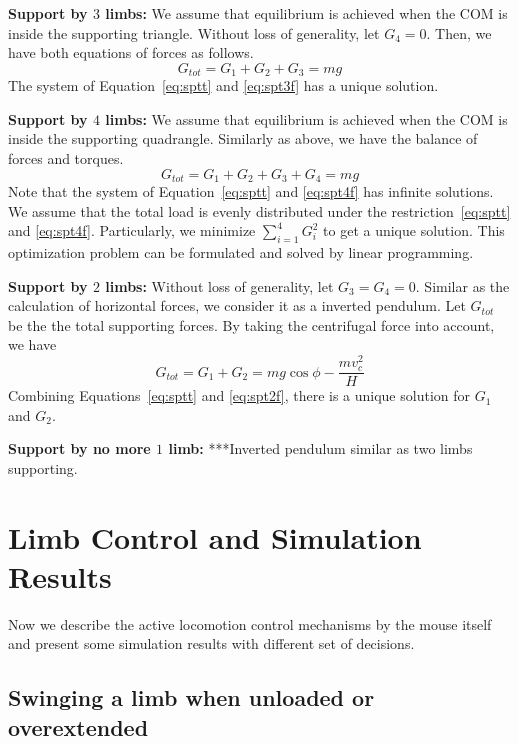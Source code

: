 \documentclass[11pt]{article}
\newcommand{\GT}{G_{tot}}
\begin{document}
\noindent\textbf{Support by $ 3 $ limbs:}
We assume that equilibrium is achieved when the COM is inside the supporting triangle. Without loss of generality, let $ G_4 = 0 $. Then, we have both equations of forces as follows.
\begin{equation}\label{eq:spt3f}
	\GT = G_1+G_2+G_3 = mg
\end{equation}
The system of Equation~\ref{eq:sptt} and \ref{eq:spt3f} has a unique solution.


\noindent\textbf{Support by $ 4 $ limbs:}
We assume that equilibrium is achieved when the COM is inside the supporting quadrangle. Similarly as above, we have the balance of forces and torques.
\begin{equation}\label{eq:spt4f}
	\GT = G_1+G_2+G_3+G_4 = mg 
\end{equation}
Note that the system of Equation~\ref{eq:sptt} and \ref{eq:spt4f} has infinite solutions. We assume that the total load is evenly distributed under the restriction~\ref{eq:sptt} and \ref{eq:spt4f}. Particularly, we minimize $ \sum_{i=1}^{4} G^2_i $ to get a unique solution. This optimization problem can be formulated and solved by linear programming.


\noindent\textbf{Support by $ 2 $ limbs:}
Without loss of generality, let $ G_3 = G_4 = 0 $. Similar as the calculation of horizontal forces, we consider it as a inverted pendulum. Let $ G_{tot} $ be the the total supporting forces. By taking the centrifugal force into account, we have
\begin{equation}\label{eq:spt2f}
	\GT = G_1 + G_2 = mg\cos\phi - \frac{mv_c^2}{H}
\end{equation}
Combining Equations~\ref{eq:sptt} and \ref{eq:spt2f}, there is a unique solution for $ G_1 $ and $ G_2 $.

\noindent\textbf{Support by no more $ 1 $ limb:}
***Inverted pendulum similar as two limbs supporting.




\section{Limb Control and Simulation Results}
Now we describe the active locomotion control mechanisms by the mouse itself and present some simulation results with different set of decisions.


\subsection{Swinging a limb when unloaded or overextended}
\end{document}
